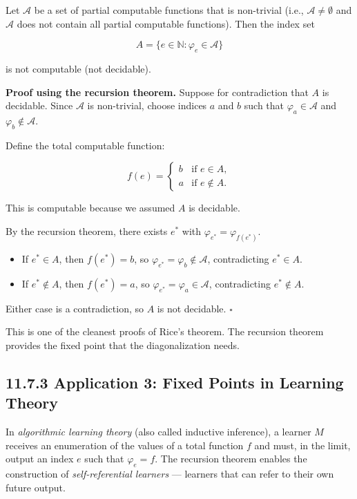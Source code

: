 \begin{theorem}[Rice 1953]
Let $\mathcal{A}$ be a set of partial computable functions that is non-trivial (i.e., $\mathcal{A} \neq \emptyset$ and $\mathcal{A}$ does not contain all partial computable functions). Then the index set

\[
A = \{ e \in \mathbb{N} : \varphi_e \in \mathcal{A}\} 
\]

is not computable (not decidable).

\textbf{Proof using the recursion theorem.} Suppose for contradiction that $A$ is decidable. Since $\mathcal{A}$ is non-trivial, choose indices $a$ and $b$ such that $\varphi_a \in \mathcal{A}$ and $\varphi_b \notin \mathcal{A}$.

Define the total computable function:

\[
f(e) = \begin{cases} b & \text{if } e \in A, \\ a & \text{if } e \notin A. \end{cases}
\]

This is computable because we assumed $A$ is decidable.

By the recursion theorem, there exists $e^*$ with $\varphi_{e^*} = \varphi_{f(e^*)}$.
\end{theorem}

\begin{itemize}
  \item If $e^* \in A$, then $f(e^*) = b$, so $\varphi_{e^*} = \varphi_b \notin \mathcal{A}$, contradicting $e^* \in A$.
  \item If $e^* \notin A$, then $f(e^*) = a$, so $\varphi_{e^*} = \varphi_a \in \mathcal{A}$, contradicting $e^* \notin A$.
\end{itemize}

Either case is a contradiction, so $A$ is not decidable. $\square$

This is one of the cleanest proofs of Rice's theorem. The recursion theorem provides the fixed point that the diagonalization needs.

\subsection{11.7.3 Application 3: Fixed Points in Learning Theory}

In \textit{algorithmic learning theory} (also called inductive inference), a learner $M$ receives an enumeration of the values of a total function $f$ and must, in the limit, output an index $e$ such that $\varphi_e = f$. The recursion theorem enables the construction of \textit{self-referential learners} --- learners that can refer to their own future output.


